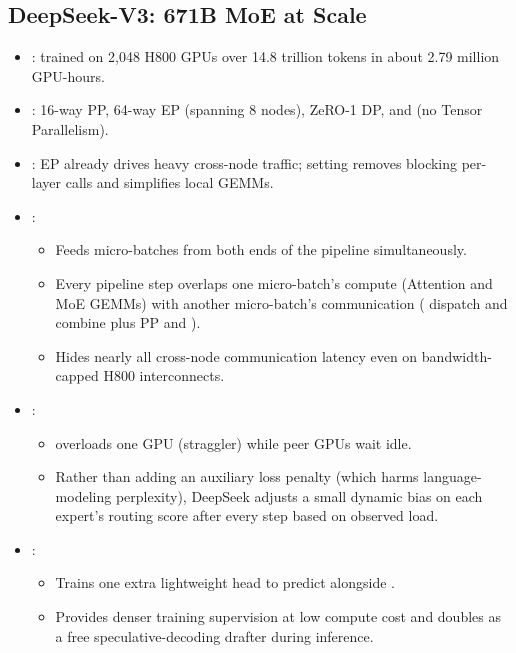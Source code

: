 \subsection{DeepSeek-V3: 671B MoE at Scale}
\begin{itemize}
    \item {}: trained on 2,048 H800 GPUs over 14.8 trillion tokens in about 2.79 million GPU-hours.
    \item {}: 16-way PP, 64-way EP (spanning 8 nodes), ZeRO-1 DP, and  (no Tensor Parallelism).
    \item {}: EP already drives heavy cross-node  traffic; setting  removes blocking per-layer  calls and simplifies local GEMMs.
    \item {}:
    \begin{itemize}
        \item Feeds micro-batches from both ends of the pipeline simultaneously.
        \item Every pipeline step overlaps one micro-batch's compute (Attention and MoE GEMMs) with another micro-batch's communication ( dispatch and combine plus PP  and ).
        \item Hides nearly all cross-node communication latency even on bandwidth-capped H800 interconnects.
    \end{itemize}
    \item {}:
    \begin{itemize}
        \item {} overloads one GPU (straggler) while peer GPUs wait idle.
        \item Rather than adding an auxiliary loss penalty (which harms language-modeling perplexity), DeepSeek adjusts a small dynamic bias on each expert's routing score after every step based on observed load.
    \end{itemize}
    \item {}:
    \begin{itemize}
        \item Trains one extra lightweight head to predict  alongside .
        \item Provides denser training supervision at low compute cost and doubles as a free speculative-decoding drafter during inference.
    \end{itemize}
\end{itemize}

